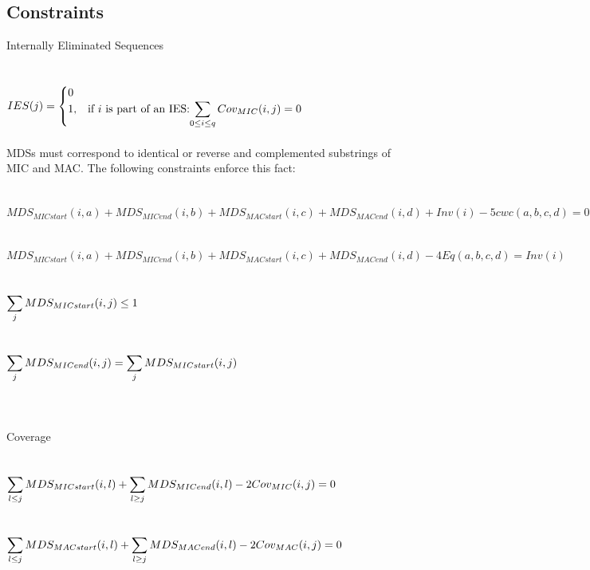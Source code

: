 \subsection{Constraints}
Internally Eliminated Sequences \\\\\\

$IES(j) = \begin{cases} 0 \\ 1, & \mbox{if } i \mbox{ is part of an IES:} \mathlarger{\sum_{0 \leq i \leq q} Cov_{MIC}(i,j) = 0} \end{cases}$

\paragraph{}MDSs must correspond to identical or reverse and complemented substrings of MIC and MAC. The following constraints enforce this fact:
\\\\\\
$MDS_{MICstart}(i,a) + MDS_{MICend}(i,b) + MDS_{MACstart}(i,c) + MDS_{MACend}(i,d) + Inv(i) - 5 cwc(a,b,c,d) = 0$ \\\\\\
$MDS_{MICstart}(i,a) + MDS_{MICend}(i,b) + MDS_{MACstart}(i,c) + MDS_{MACend}(i,d) - 4 Eq(a,b,c,d) = Inv(i)$ \\\\\\
$\mathlarger{\sum_{j} MDS_{MICstart}(i,j)\leq 1}$ \\\\\\
$\mathlarger{\sum_{j} MDS_{MICend}(i,j) = \sum_{j} MDS_{MICstart}(i,j)}$ \\\\\\

\paragraph{} Coverage
\\\\\\
$\mathlarger{\sum_{l\leq j} MDS_{MICstart}(i,l) + \sum_{l\geq j}MDS_{MICend}(i,l) - 2Cov_{MIC}(i,j) = 0}$ \\\\\\
$\mathlarger{\sum_{l\leq j} MDS_{MACstart}(i,l) + \sum_{l\geq j}MDS_{MACend}(i,l) - 2Cov_{MAC}(i,j) = 0}$ \\\\\\